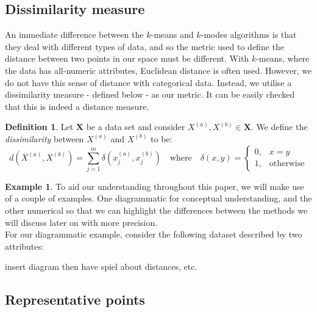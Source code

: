 \documentclass{article}
\theoremstyle{definition}
\newtheorem{definition}{Definition}[section]
\newtheorem{example}{Example}
\begin{document}
\subsection{Dissimilarity measure}\label{subsection:dissim}

An immediate difference between the \(k\)-means and \(k\)-modes algorithms is 
that they deal with different types of data, and so the metric used to define 
the distance between two points in our space must be different. With 
\(k\)-means, where the data has all-numeric attributes, Euclidean distance is 
often used. However, we do not have this sense of distance with categorical 
data. Instead, we utilise a dissimilarity measure - defined below - as our 
metric. It can be easily checked that this is indeed a distance measure.\\

\begin{definition}\label{def:dissim}
Let $\textbf{X}$ be a data set and consider $X^{(a)}, X^{(b)} \in 
\textbf{X}$. We define the \emph{dissimilarity} between $X^{(a)}$ and 
$X^{(b)}$ to be:
\[
	d(X^{(a)}, X^{(b)}) = \sum_{j=1}^{m} \delta(x_j^{(a)}, x_j^{(b)}) \quad
	\text{where} \quad \delta(x, y) = \begin{cases}
                                        0, & x = y \\
					                    1, & \text{otherwise}
					                  \end{cases}
\]
\end{definition}

\begin{example}\label{ex:notation}
To aid our understanding throughout this paper, we will make use of a couple of
examples. One diagrammatic for conceptual understanding, and the other numerical
so that we can highlight the differences between the methods we will discuss 
later on with more precision.\\

For our diagrammatic example, consider the following dataset described by two
attributes:

\large{insert diagram then have spiel about distances, etc.}

\end{example}

\subsection{Representative points}\label{subsection:rep-points}
\end{document}
